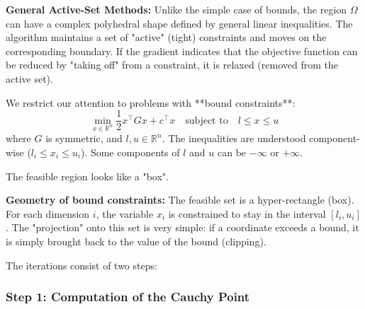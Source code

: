 \begin{figureexplanation}
\textbf{General Active-Set Methods:}
Unlike the simple case of bounds, the region $\Omega$ can have a complex polyhedral shape defined by general linear inequalities.
The algorithm maintains a set of "active" (tight) constraints and moves on the corresponding boundary. If the gradient indicates that the objective function can be reduced by "taking off" from a constraint, it is relaxed (removed from the active set).
\end{figureexplanation}

We restrict our attention to problems with **bound constraints**:
\begin{equation}
    \min_{x \in \mathbb{R}^n} \frac{1}{2} x^\top G x + c^\top x \quad \text{subject to} \quad l \le x \le u
\end{equation}
where $G$ is symmetric, and $l, u \in \mathbb{R}^n$. The inequalities are understood component-wise ($l_i \le x_i \le u_i$). Some components of $l$ and $u$ can be $-\infty$ or $+\infty$.

The feasible region looks like a "box".

\begin{center}
\end{center}

\begin{figureexplanation}
\textbf{Geometry of bound constraints:}
The feasible set is a hyper-rectangle (box). For each dimension $i$, the variable $x_i$ is constrained to stay in the interval $[l_i, u_i]$.
The "projection" onto this set is very simple: if a coordinate exceeds a bound, it is simply brought back to the value of the bound (clipping).
\end{figureexplanation}

The iterations consist of two steps:

\subsubsection{Step 1: Computation of the Cauchy Point}

